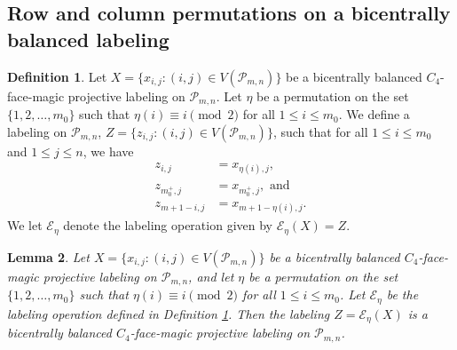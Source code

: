 \documentclass[12pt]{amsart}
\theoremstyle{definition}
\newtheorem{definition}{Definition}
\theoremstyle{plain}
\newtheorem{lemma}[definition]{Lemma}
\begin{document}
\subsection{Row and column permutations on a bicentrally balanced labeling}

\begin{definition} \label{defnElementaryProjectivePermutationColumns}
  Let $X=\{x_{i,j}:(i,j)\in V(\mathcal{P}_{m,n})\}$ be a bicentrally balanced $C_4$-face-magic projective labeling on $\mathcal{P}_{m,n}$.
  Let $\eta$ be a permutation on the set $\{1,2,\ldots,m_0\}$ such that $\eta(i)\equiv i \pmod{2}$ for all $1 \leqslant i \leqslant m_0$.
  We define a labeling on $\mathcal{P}_{m,n}$, $Z=\{z_{i,j}:(i,j)\in V(\mathcal{P}_{m,n})\}$,
  such that for all $1 \leqslant i \leqslant m_0$ and $1 \leqslant j \leqslant n$, we have
    \begin{align*}
      z_{i,j} &= x_{\eta(i),j},  \\
      z_{m_0^{+},j} &= x_{m_0^{+},j}, \mbox{ and}\\
       z_{m+1-i,j} &= x_{m+1-\eta(i),j}.
    \end{align*}
    We let $\mathcal{E}_{\eta}$ denote the labeling operation given by $\mathcal{E}_{\eta}(X)=Z$.
\end{definition}

\begin{lemma}  \label{lemmaElementaryProjectivePermutationColumns}
  Let $X=\{x_{i,j}:(i,j)\in V(\mathcal{P}_{m,n})\}$ be a bicentrally balanced $C_4$-face-magic projective labeling on $\mathcal{P}_{m,n}$, and
  let $\eta$ be a permutation on the set $\{1,2,\ldots,m_0\}$ such that $\eta(i)\equiv i \pmod{2}$ for all $1 \leqslant i \leqslant m_0$.
  Let $\mathcal{E}_{\eta}$ be the labeling operation defined in Definition \ref{defnElementaryProjectivePermutationColumns}.
  Then the labeling $Z=\mathcal{E}_{\eta}(X)$ is a bicentrally balanced $C_4$-face-magic projective labeling on $\mathcal{P}_{m,n}$.
\end{lemma}
\end{document}
